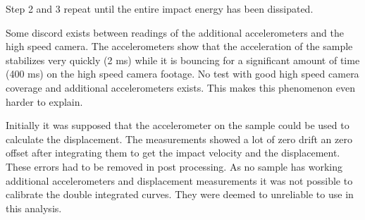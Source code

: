 Step 2 and 3 repeat until the entire impact energy has been dissipated.

Some discord exists between readings of the additional accelerometers and the high speed camera. The accelerometers show that the acceleration of the sample stabilizes very quickly (2 ms) while it is bouncing for a significant amount of time (400 ms) on the high speed camera footage. No test with good high speed camera coverage and additional accelerometers exists. This makes this phenomenon even harder to explain.

Initially it was supposed that the accelerometer on the sample could be used to calculate the displacement. The measurements showed a lot of zero drift an zero offset after integrating them to get the impact velocity and the displacement. These errors had to be removed in post processing. As no sample has working additional accelerometers and displacement measurements it was not possible to calibrate the double integrated curves. They were deemed to unreliable to use in this analysis.

